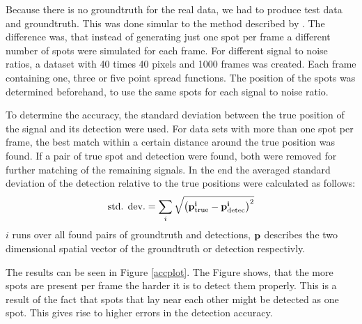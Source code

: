Because there is no groundtruth for the real data, we had to produce test data and groundtruth. This was done simular to the method described by \cite{simulated}. The difference was, that instead of generating just one spot per frame a different number of spots were simulated for each frame. For different signal to  noise ratios, a dataset with 40 times 40 pixels and 1000 frames was created. Each frame containing one, three or five point spread functions. The position of the spots was determined beforehand, to use the same spots for each signal to noise ratio.\newline

To determine the accuracy, the standard deviation between the true position of the signal and its detection were used. For data sets with more than one spot per frame, the best match within a certain distance around the true position was found. If a pair of true spot and detection were found, both were removed for further matching of the remaining signals. In the end the averaged standard deviation of the detection relative to the true positions were calculated as follows:
\begin{align}
	\text{std. dev.} = \sum_i \sqrt{\left(\bf{p}_{\text{true}}^i - \bf{p}_{\text{detec}}^i\right)^2}
\end{align}
$i$ runs over all found pairs of groundtruth and detections, $\bf{p}$ describes the two dimensional spatial vector of the groundtruth or detection respectivly.\newline

The results can be seen in Figure \ref{accplot}. The Figure shows, that the more spots are present per frame the harder it is to detect them properly. This is a result of the fact that spots that lay near each other might be detected as one spot. This gives rise to higher errors in the detection accuracy.


